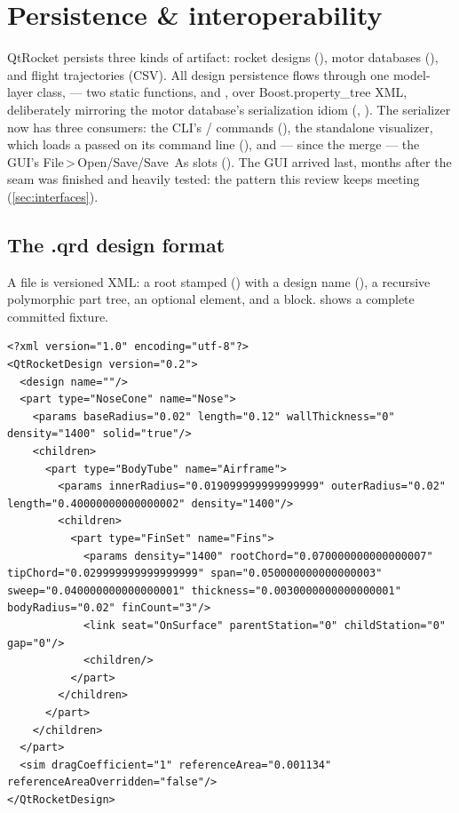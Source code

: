 \section{Persistence \& interoperability}\label{sec:persistence}

QtRocket persists three kinds of artifact: rocket designs (), motor databases
(), and flight trajectories (CSV). All design persistence flows through one model-layer
class,  --- two static functions,  and , over
Boost.property\_tree XML, deliberately mirroring the motor database's serialization idiom
(, ). The serializer now has
three consumers: the CLI's / commands
(), the standalone visualizer, which loads a  passed on its
command line (), and --- since the
 merge --- the GUI's File\,>\,Open/Save/Save~As slots
(). The GUI arrived last, months after the seam was finished and
heavily tested: the pattern this review keeps meeting (\cref{sec:interfaces}).

\subsection{The .qrd design format}

A  file is versioned XML: a  root stamped
 () with a design name
(), a recursive polymorphic part tree, an optional
 element, and a  block.  shows a complete
committed fixture.

\begin{listing}[htbp]
\begin{verbatim}
<?xml version="1.0" encoding="utf-8"?>
<QtRocketDesign version="0.2">
  <design name=""/>
  <part type="NoseCone" name="Nose">
    <params baseRadius="0.02" length="0.12" wallThickness="0" density="1400" solid="true"/>
    <children>
      <part type="BodyTube" name="Airframe">
        <params innerRadius="0.019099999999999999" outerRadius="0.02" length="0.40000000000000002" density="1400"/>
        <children>
          <part type="FinSet" name="Fins">
            <params density="1400" rootChord="0.070000000000000007" tipChord="0.029999999999999999" span="0.050000000000000003" sweep="0.040000000000000001" thickness="0.0030000000000000001" bodyRadius="0.02" finCount="3"/>
            <link seat="OnSurface" parentStation="0" childStation="0" gap="0"/>
            <children/>
          </part>
        </children>
      </part>
    </children>
  </part>
  <sim dragCoefficient="1" referenceArea="0.001134" referenceAreaOverridden="false"/>
</QtRocketDesign>
\end{verbatim}
\caption{A complete  design file ().
Doubles are written at full precision, and placement is stored as  intent, never as a
resolved pose.}\label{lst:persistence-qrd}
\end{listing}

